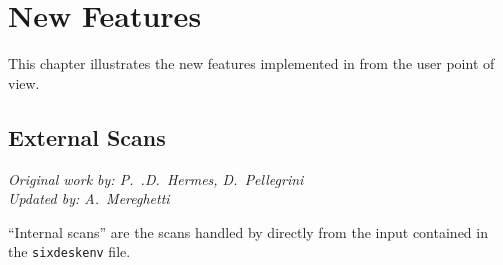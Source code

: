 \chapter{New Features} \label{NewFeatures}
This chapter illustrates the new features implemented in \SIXDESK{} from
the user point of view.

\section{External Scans} \label{ExternalScans}
\begin{flushright}
\emph{Original work by: P.~.D.~Hermes, D.~Pellegrini} \\
\emph{Updated by: A.~Mereghetti}
\end{flushright}
``Internal scans'' are the scans handled by \SIXDESK{} directly from the
input contained in the \texttt{sixdeskenv} file. 
